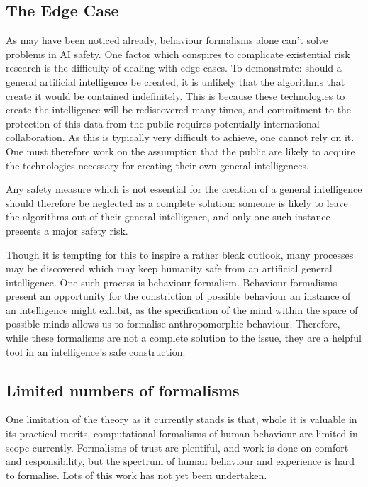 \subsection{The Edge Case}
As may have been noticed already, behaviour formalisms alone can't solve problems in AI safety. One factor which conspires to complicate existential risk research is the difficulty of dealing with edge cases. To demonstrate: should a general artificial intelligence be created, it is unlikely that the algorithms that create it would be contained indefinitely. This is because these technologies to create the intelligence will be rediscovered many times, and commitment to the protection of this data from the public requires potentially international collaboration. As this is typically very difficult to achieve, one cannot rely on it. One must therefore work on the assumption that the public are likely to acquire the technologies necessary for creating their own general intelligences.\par

Any safety measure which is not essential for the creation of a general intelligence should therefore be neglected as a complete solution: someone is likely to leave the algorithms out of their general intelligence, and only one such instance presents a major safety risk.\par

Though it is tempting for this to inspire a rather bleak outlook, many processes may be discovered which may keep humanity safe from an artificial general intelligence. One such process is behaviour formalism. Behaviour formalisms present an opportunity for the constriction of possible behaviour an instance of an intelligence might exhibit, as the specification of the mind within the space of possible minds allows us to formalise anthropomorphic behaviour. Therefore, while these formalisms are not a complete solution to the issue, they are a helpful tool in an intelligence's safe construction.\par

\subsection{Limited numbers of formalisms}
One limitation of the theory as it currently stands is that, whole it is valuable in its practical merits, computational formalisms of human behaviour are limited in scope currently. Formalisms of trust are plentiful, and work is done on comfort and responsibility, but the spectrum of human behaviour and experience is hard to formalise. Lots of this work has not yet been undertaken. \par

